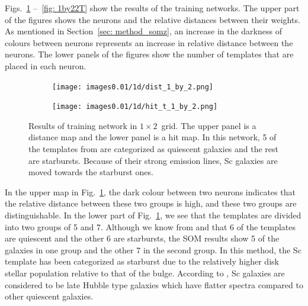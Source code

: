             Figs.~\ref{fig: 1by2T} --~\ref{fig: 1by22T} show the results of the training networks.  
            The upper part of the figures shows the neurons and the relative distances between their weights. 
            As mentioned in Section~\ref{sec: method_somz}, an increase in the darkness of colours between neurons represents an increase in relative distance between the neurons.
            The lower panels of the figures show the number of  templates that are placed in each neuron. 
            \begin{figure}
                \begin{subfigure}[b]{0.45\textwidth}
                    \centering
                  \texttt{[image: images0.01/1d/dist\_1\_by\_2.png]}
                \end{subfigure}
                \hfill
                \begin{subfigure}[b]{0.45\textwidth}
                    \centering \texttt{[image: images0.01/1d/hit\_t\_1\_by\_2.png]}
                \end{subfigure}
                \caption[Results of training network in $1\times2$~grid]{Results of training network in $1\times2$~grid. The upper panel is a distance map and the lower panel is a hit map. In this network, 5 of the templates from \citet{Kinney96} are categorized as quiescent galaxies and the rest are starbursts. Because of their strong emission lines, Sc galaxies are moved towards the starburst ones.}
                 \label{fig: 1by2T}
            \end{figure}
        
        
            In the upper map in Fig.~\ref{fig: 1by2T}, the dark colour between two neurons indicates that the relative distance between these two groups is high, and these two groups are distinguishable.
            In the lower part of Fig.~\ref{fig: 1by2T}, we see that the templates are divided into two groups of 5 and 7.
            Although we know from  and  that 6 of the templates are quiescent and the other 6 are starbursts, the SOM results show 5 of the galaxies in one group and the other 7 in the second group.
            In this method, the Sc template has been categorized as starburst due to the relatively higher disk stellar population relative to that of the bulge. 
            According to , Sc galaxies are considered to be late Hubble type galaxies which have  flatter spectra compared to other quiescent galaxies. 
            

